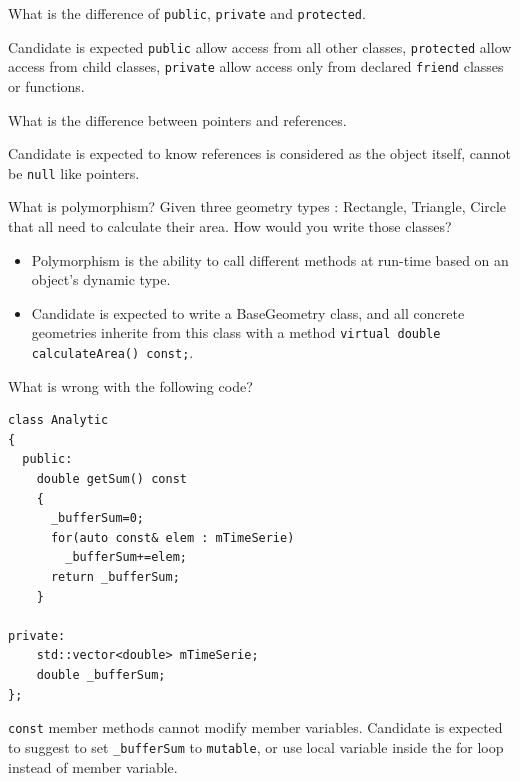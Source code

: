 \documentclass{exam}%
\begin{document}
\begin{questions}
\question What is the difference of \lstinline{public}, \lstinline{private} and \lstinline{protected}.
\begin{solution}[.2in]
	Candidate is expected \lstinline{public} allow access from all other classes, \lstinline{protected} allow access from child classes, \lstinline{private} allow access only from declared \lstinline{friend} classes or functions.
\end{solution}

\question What is the difference between pointers and references.
\begin{solution}[.2in]
    Candidate is expected to know references is considered as the object itself, cannot be \lstinline{null} like pointers.
\end{solution}

\question What is polymorphism? Given three geometry types : Rectangle, Triangle, Circle that all need to calculate their area. How would you write those classes?
\begin{solution}[.2in]
\begin{itemize}
	\item Polymorphism is the ability to call different methods at run-time based on an object’s dynamic type. 
	\item Candidate is expected to write a BaseGeometry class, and all concrete geometries inherite from this class with a method \lstinline{virtual double calculateArea() const;}.
\end{itemize}
\end{solution}

\question What is wrong with the following code?
\begin{lstlisting}
class Analytic
{
  public:
    double getSum() const
    {
      _bufferSum=0;
      for(auto const& elem : mTimeSerie)
        _bufferSum+=elem;
      return _bufferSum;
    }

private:
    std::vector<double> mTimeSerie;
    double _bufferSum;
};

\end{lstlisting}
\begin{solution}[.2in]
\lstinline{const} member methods cannot modify member variables. Candidate is expected to suggest to set \lstinline{_bufferSum} to \lstinline{mutable}, or use local variable inside the for loop instead of member variable.
\end{solution}


\end{questions}
\end{document}
